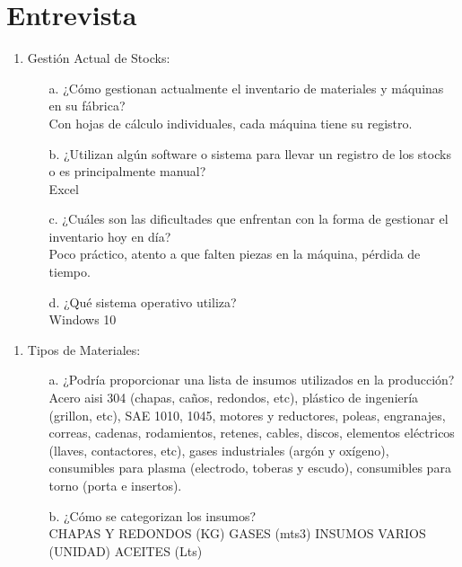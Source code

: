 \documentclass{article}
\begin{document}
\section{Entrevista}
    \begin{enumerate}
        \item Gestión Actual de Stocks:
            \begin{enumerate}[label=\Alph*.]
                \item[a.] ¿Cómo gestionan actualmente el inventario de materiales y máquinas en su fábrica? \\
                    Con hojas de cálculo individuales, cada máquina tiene su registro.
                \item[b.] ¿Utilizan algún software o sistema para llevar un registro de los stocks o es principalmente manual? \\
                    Excel
                \item[c.] ¿Cuáles son las dificultades que enfrentan con la forma de gestionar el inventario hoy en día? \\
                    Poco práctico, atento a que falten piezas en la máquina, pérdida de tiempo. 
                \item[d.] ¿Qué sistema operativo utiliza? \\
                    Windows 10
            \end{enumerate}
    \end{enumerate}
    
    \begin{enumerate}[start=2]
        \item Tipos de Materiales:
            \begin{enumerate}[label=\Alph*.]
            \item[a.]  ¿Podría proporcionar una lista de insumos utilizados en la producción? \\
                Acero aisi 304 (chapas, caños, redondos, etc), plástico de ingeniería (grillon, etc), SAE 1010, 1045, motores y reductores, poleas, engranajes, correas, cadenas, rodamientos, retenes, cables, discos, elementos eléctricos (llaves, contactores, etc), gases industriales (argón y oxígeno), consumibles para plasma (electrodo, toberas y escudo), consumibles para torno (porta e insertos).
            \item[b.]  ¿Cómo se categorizan los insumos? \\       
                CHAPAS Y REDONDOS (KG) GASES (mts3) INSUMOS VARIOS (UNIDAD) ACEITES (Lts)
            \end{enumerate}
    \end{enumerate}
\end{document}
